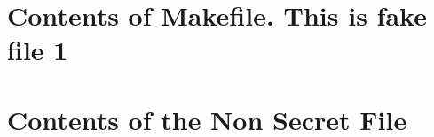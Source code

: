 \documentclass{article}
\begin{document}
\section*{Contents of Makefile. This is fake file 1}


\section*{Contents of the Non Secret File}

\end{document}
